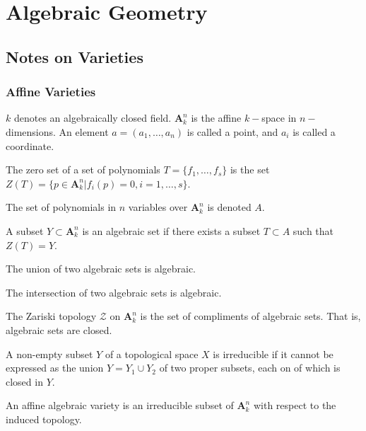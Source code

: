 \documentclass[crop=false,class=article,oneside]{standalone}
\begin{document}
    \ifx\ifgeoalg\undefined
        \section*{Algebraic Geometry}
        \setcounter{section}{1}
    \fi
\subsection{Notes on Varieties}
    \subsubsection{Affine Varieties}
    $k$ denotes an algebraically closed field. $\textbf{A}_{k}^n$ is the affine $k-$space in $n-$dimensions. An element $a=(a_1,\hdots, a_n)$ is called a point, and $a_i$ is called a coordinate.
    \begin{definition}
    The zero set of a set of polynomials $T = \{f_1,\hdots, f_s\}$ is the set $Z(T) = \{p\in \textbf{A}_k^n|f_i(p) = 0,i=1,\hdots, s\}$.
    \end{definition}
    \begin{notation}
    The set of polynomials in $n$ variables over $\textbf{A}_k^n$ is denoted $A$.
    \end{notation}
    \begin{definition}
    A subset $Y\subset \textbf{A}_k^n$ is an algebraic set if there exists a subset $T\subset A$ such that $Z(T) = Y$.
    \end{definition}
    \begin{theorem}
    The union of two algebraic sets is algebraic.
    \end{theorem}
    \begin{theorem}
    The intersection of two algebraic sets is algebraic.
    \end{theorem}
    \begin{definition}
    The Zariski topology $\mathcal{Z}$ on $\textbf{A}_{k}^n$ is the set of compliments of algebraic sets. That is, algebraic sets are closed.
    \end{definition}
    \begin{definition}
    A non-empty subset $Y$ of a topological space $X$ is irreducible if it cannot be expressed as the union $Y=Y_1\cup Y_2$ of two proper subsets, each on of which is closed in $Y$.
    \end{definition}
    \begin{definition}
    An affine algebraic variety is an irreducible subset of $\textbf{A}_k^n$ with respect to the induced topology.
    \end{definition}
\end{document}
